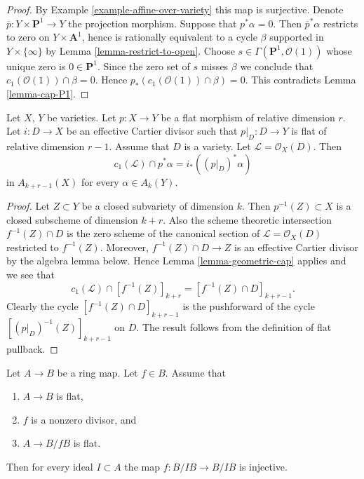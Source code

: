 \begin{proof}
By Example \ref{example-affine-over-variety} this map is surjective.
Denote $\overline{p} : Y \times \mathbf{P}^1 \to Y$ the projection
morphism. Suppose that $p^*\alpha = 0$. Then $\overline{p}^*\alpha$
restricts to zero on $Y \times \mathbf{A}^1$, hence is rationally
equivalent to a cycle $\beta$ supported in $Y \times \{\infty\}$ by
Lemma \ref{lemma-restrict-to-open}.
Choose $s \in \Gamma(\mathbf{P}^1, \mathcal{O}(1))$
whose unique zero is $0 \in \mathbf{P}^1$. Since the zero set of $s$
misses $\beta$ we conclude that $c_1(\mathcal{O}(1)) \cap \beta = 0$.
Hence $p_*(c_1(\mathcal{O}(1)) \cap \beta) = 0$. This contradicts
Lemma \ref{lemma-cap-P1}.
\end{proof}


\begin{lemma}
\label{lemma-relative-effective-cartier}
Let $X$, $Y$ be varieties.
Let $p : X \to Y$ be a flat morphism of relative dimension $r$.
Let $i : D \to X$ be an effective Cartier divisor such that
$p|_D : D \to Y$ is flat of relative dimension $r - 1$. Assume that
$D$ is a variety. Let $\mathcal{L} = \mathcal{O}_X(D)$.
Then
$$
c_1(\mathcal{L}) \cap p^*\alpha = i_* ((p|_D)^*\alpha)
$$
in $A_{k + r - 1}(X)$ for every $\alpha \in A_k(Y)$.
\end{lemma}

\begin{proof}
Let $Z \subset Y$ be a closed subvariety of dimension $k$.
Then $p^{-1}(Z) \subset X$ is a closed subscheme of dimension
$k + r$. Also the scheme theoretic intersection $f^{-1}(Z) \cap D$ is
the zero scheme of the canonical section of $\mathcal{L} = \mathcal{O}_X(D)$
restricted to $f^{-1}(Z)$. Moreover, $f^{-1}(Z) \cap D \to Z$ is an
effective Cartier divisor by the algebra lemma below. Hence
Lemma \ref{lemma-geometric-cap} applies and we see that
$$
c_1(\mathcal{L}) \cap [f^{-1}(Z)]_{k + r} =
[f^{-1}(Z) \cap D]_{k + r - 1}.
$$
Clearly the cycle $[f^{-1}(Z) \cap D]_{k + r - 1}$ is the
pushforward of the cycle $[(p|_D)^{-1}(Z)]_{k + r - 1}$ on $D$.
The result follows from the definition of flat pullback.
\end{proof}

\begin{lemma}
\label{lemma-relative-effective-cartier-algebra}
Let $A \to B$ be a ring map. Let $f \in B$. Assume that
\begin{enumerate}
\item $A \to B$ is flat,
\item $f$ is a nonzero divisor, and
\item $A \to B/fB$ is flat.
\end{enumerate}
Then for every ideal $I \subset A$ the map
$f : B/IB \to B/IB$ is injective.
\end{lemma}

